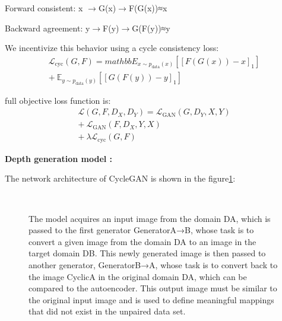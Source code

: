 \documentclass[10pt,twocolumn,letterpaper]{article}
\begin{document}
  Forward consistent: x $\to$G(x)$\to$F(G(x))≈x
  
  Backward agreement: y$\to$F(y)$\to$G(F(y))≈y

  We incentivize this behavior using a cycle consistency loss:
 \begin{align}
   \mathcal{L}_{\text{cyc}}(G, F) =  mathbb{E}_{x\sim p_{\text{data}}(x)} [[{F(G(x))-x}]_1] \nonumber \\ 
   + \ \mathbb{E}_{y\sim p_{\text{data}}(y)}[[{G(F(y))-y}]_1]
 \end{align}

 full objective loss function is:
 \begin{align}
  \mathcal{L}(G,F,D_X,D_Y) = \mathcal{L}_{\text{GAN}}(G,D_Y,X,Y) \nonumber \\
  +\ \mathcal{L}_{\text{GAN}}(F,D_X,Y,X) \nonumber \\
  +\  \lambda \mathcal{L}_{\text{cyc}}(G, F)
 \end{align}
 
 
 {\bf Depth generation model :}
 
 
The network architecture of CycleGAN is shown in the figure\ref{fig:1}:

  


\begin{figure}
  \centering
{}
\caption{The model acquires an input image from the domain DA, 
which is passed to the first generator GeneratorA→B, 
whose task is to convert a given image from the 
domain DA to an image in the target domain DB. 
This newly generated image is then passed to another generator, 
GeneratorB→A, whose task is to convert back to 
the image CyclicA in the original domain DA,
which can be compared to the autoencoder. 
This output image must be similar to the 
original input image and is used to define 
meaningful mappings that did not exist in the unpaired data set.} 
\label{fig:1}
\end{figure}
\end{document}
